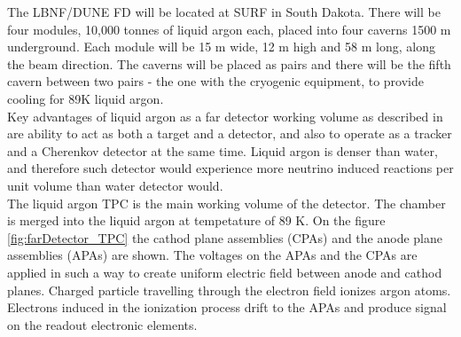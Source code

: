 The LBNF/DUNE FD will be located at SURF in South Dakota. There will be four modules, 10,000 tonnes of liquid argon each, placed into four caverns 1500 m underground. Each module will be 15 m wide, 12 m high and 58 m long, along the beam direction. The caverns will be placed as pairs and there will be the fifth cavern between two pairs - the one with the cryogenic equipment, to provide cooling for 89K liquid argon.\\ 
Key advantages of liquid argon as a far detector working volume as described in \cite{ref_aboutLAr} are ability to act as both a target and a detector, and also to operate as a tracker and a Cherenkov detector at the same time. Liquid argon is denser than water, and therefore such detector would experience more neutrino induced reactions per unit volume than water detector would. \\

The liquid argon TPC is the main working volume of the detector. The chamber is merged into the liquid argon at tempetature of 89 K. On the figure \ref{fig:farDetector_TPC} the cathod plane assemblies (CPAs) and the anode plane assemblies (APAs) are shown. The voltages on the APAs and the CPAs are applied in such a way to create uniform electric field between anode and cathod planes. Charged particle travelling through the electron field ionizes argon atoms. Electrons induced in the ionization process drift to the APAs and produce signal on the readout electronic elements.


